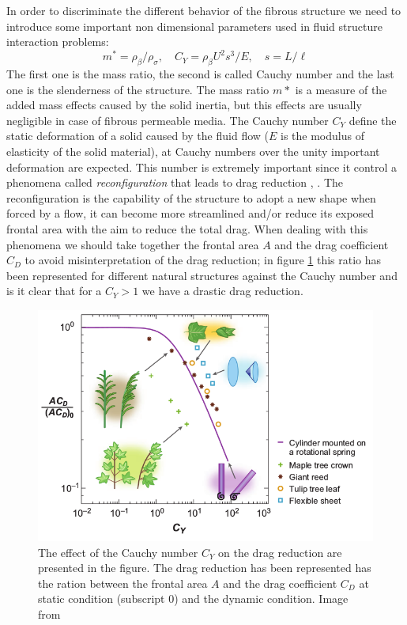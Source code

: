 In order to discriminate the different behavior of the fibrous structure we need to introduce some important non dimensional parameters used in fluid structure interaction problems:
$$ m^* = \rho_{\beta} / \rho_{\sigma}, \quad C_Y= \rho_{\beta} U^2 s^3 / E, \quad s = L/\ell $$
The first one is the mass ratio, the second is called Cauchy number and the last one is the slenderness of the structure.
The mass ratio $m*$ is a measure of the added mass effects caused by the solid inertia, but this effects are usually negligible in case of fibrous permeable media.
The Cauchy number $C_Y$ define the static deformation of a solid caused by the fluid flow ($E$ is the modulus of elasticity of the solid material), at Cauchy numbers over the unity important deformation are expected.
This number is extremely important since it control a phenomena called \textit{reconfiguration} that leads to drag reduction \citet{gosselin2011drag}, \citet{alvarado2017nature}.
The reconfiguration is the capability of the structure to adopt a new shape when forced by a flow, it can become more streamlined and/or reduce its exposed frontal area with the aim to reduce the total drag.
When dealing with this phenomena we should take together the frontal area $A$ and the drag coefficient $C_D$ to avoid misinterpretation of the drag reduction; in figure \ref{fig:cycd} this ratio has been represented for different natural structures against the Cauchy number and is it clear that for a $C_Y>1$ we have a drastic drag reduction.

\begin{figure}[h]
	\centering
	\includegraphics[width=0.7\linewidth]{chapter_1/cy_cd}
	\caption{The effect of the Cauchy number $C_Y$ on the drag reduction are presented in the figure. The drag reduction has been represented has the ration between the frontal area $A$ and the drag coefficient $C_D$ at static condition (subscript $0$) and the dynamic condition. Image from \citet{de2008effects}}
	\label{fig:cycd}
\end{figure}

